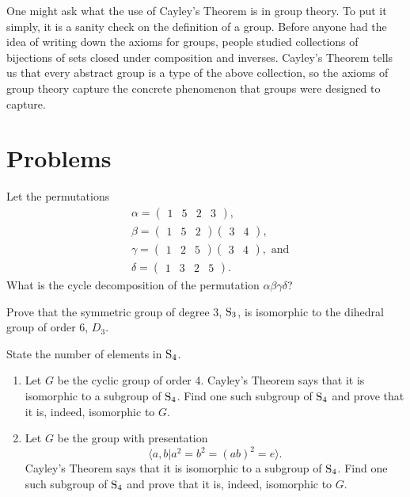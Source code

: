 One might ask what the use of Cayley's Theorem is in group theory. To put it simply, it is a sanity check on the definition of a group. Before anyone had the idea of writing down the axioms for groups, people studied collections of bijections of sets closed under composition and inverses. Cayley's Theorem tells us that every abstract group is a type of the above collection, so the axioms of group theory capture the concrete phenomenon that groups were designed to capture.

\newpage

\section{Problems}
\begin{problem}
    Let the permutations
    \begin{align*}
        &\alpha = \begin{pmatrix}1 & 5 & 2 & 3\end{pmatrix},\\
        &\beta  = \begin{pmatrix}1 & 5 & 2\end{pmatrix}\begin{pmatrix}3 & 4\end{pmatrix},\\
        &\gamma = \begin{pmatrix}1 & 2 & 5\end{pmatrix}\begin{pmatrix}3 & 4\end{pmatrix}, \text{ and}\\
        &\delta = \begin{pmatrix}1 & 3 & 2 & 5\end{pmatrix}.
    \end{align*}
    What is the cycle decomposition of the permutation $\alpha\beta\gamma\delta$?
\end{problem}

\begin{problem}
    Prove that the symmetric group of degree 3, $\mathrm{S}_{3}$, is isomorphic to the dihedral group of order 6, $D_3$.
\end{problem}

\begin{problem}
    State the number of elements in $\mathrm{S}_{4}$.
    \begin{enumerate}[label=(\alph*)]
        \item Let $G$ be the cyclic group of order 4. Cayley's Theorem says that it is isomorphic to a subgroup of $\mathrm{S}_{4}$. Find one such subgroup of $\mathrm{S}_{4}$ and prove that it is, indeed, isomorphic to $G$.
        \item Let $G$ be the group with presentation
        \[
            \langle a, b \vert a^2 = b^2 = (ab)^2 = e \rangle.
        \]
        Cayley's Theorem says that it is isomorphic to a subgroup of $\mathrm{S}_{4}$. Find one such subgroup of $\mathrm{S}_{4}$ and prove that it is, indeed, isomorphic to $G$.
    \end{enumerate}
\end{problem}


